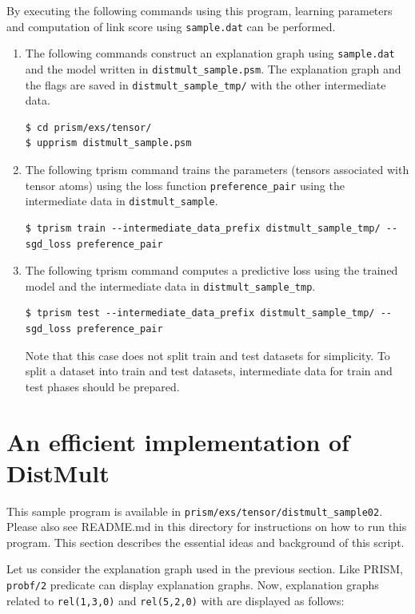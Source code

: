 \documentclass[a4paper]{report}
\begin{document}
By executing the following commands using this program, learning parameters and computation of link score using {\tt sample.dat} can be performed.
\begin{enumerate}
\item The following commands construct an explanation graph using {\tt sample.dat} and the model written in {\tt distmult\_sample.psm}. The explanation graph and the flags are saved  in \verb|distmult_sample_tmp/| with the other intermediate data.

\begin{verbatim}
$ cd prism/exs/tensor/
$ upprism distmult_sample.psm
\end{verbatim}
	
\item The following tprism command trains the parameters (tensors associated with tensor atoms) using the loss function {\tt preference\_pair} using the intermediate data in {\tt distmult\_sample}.
\begin{verbatim}
$ tprism train --intermediate_data_prefix distmult_sample_tmp/ --sgd_loss preference_pair
\end{verbatim}

\item The following tprism command computes a predictive loss using the trained model and the intermediate data in {\tt distmult\_sample\_tmp}.
\begin{verbatim}
$ tprism test --intermediate_data_prefix distmult_sample_tmp/ --sgd_loss preference_pair
\end{verbatim}
Note that this case does not split train and test datasets for simplicity.
To split a dataset into train and test datasets, intermediate data for train and test phases should be prepared.
\end{enumerate}



\section{An efficient implementation of DistMult}
\label{sec:distmult02}

This sample program is available in \verb|prism/exs/tensor/distmult_sample02|.
Please also see README.md in this directory for instructions on how to run this program.
This section describes the essential ideas and background of this script. 


Let us consider the explanation graph used in the previous section.
Like PRISM, {\tt probf/2} predicate can display explanation graphs.
Now, explanation graphs related to {\tt rel(1,3,0)} and {\tt rel(5,2,0)} with  are displayed as follows:
\end{document}
